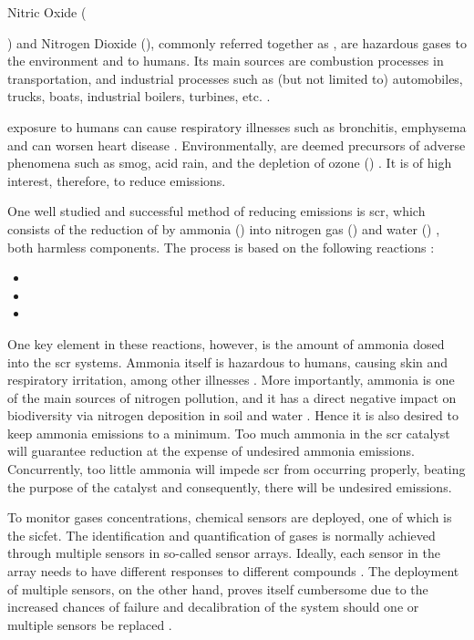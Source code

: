 Nitric Oxide ({) and Nitrogen Dioxide (), commonly referred together as \nox,  are hazardous gases to the environment and to humans. Its main sources are combustion processes in transportation, and industrial processes such as (but not limited to) automobiles, trucks, boats, industrial boilers, turbines, etc. \parencite{EPA_2019}.

\nox exposure to humans can cause respiratory illnesses such as bronchitis, emphysema and can worsen heart disease \parencite{Boningari_2016}. Environmentally, \nox are deemed precursors of adverse phenomena such as smog, acid rain, and the depletion of ozone () \parencite{Bernabeo_2019}. It is of high interest, therefore, to reduce \nox emissions.

One well studied and successful method of reducing emissions is \acrfull{scr}, which consists of the reduction of \nox by ammonia () into nitrogen gas () and water () \parencite{Forzatti_2001}, both harmless components. The process is based on the following reactions \parencite{Forzatti_2001}:
\begin{itemize}
	\item {}
	
	\item {}
	
	\item {}
\end{itemize}


One key element in these reactions, however, is the amount of ammonia dosed into the \acrshort{scr} systems. Ammonia itself is hazardous to humans, causing skin and respiratory irritation, among other illnesses \parencite{ASTDRA_2004}. More importantly, ammonia is one of the main sources of nitrogen pollution, and it has a direct negative impact on biodiversity via nitrogen deposition in soil and water \parencite{RAND_2018}. Hence it is also desired to keep ammonia emissions to a minimum. Too much ammonia in the \acrshort{scr} catalyst will guarantee \nox reduction at the expense of undesired ammonia emissions. Concurrently, too little ammonia will impede \acrshort{scr} from occurring properly, beating the purpose of the catalyst and consequently, there will be undesired \nox emissions.

To monitor gases concentrations, chemical sensors are deployed, one of which is the \acrfull{sicfet}. The identification and quantification of gases is normally achieved through multiple sensors in so-called sensor arrays. Ideally, each sensor in the array needs to have different responses to different compounds \parencite{Bastuck_2019}. The deployment of multiple sensors, on the other hand, proves itself cumbersome due to the increased chances of failure and decalibration of the system should one or multiple sensors be replaced \parencite{Bastuck_2019}.

}
